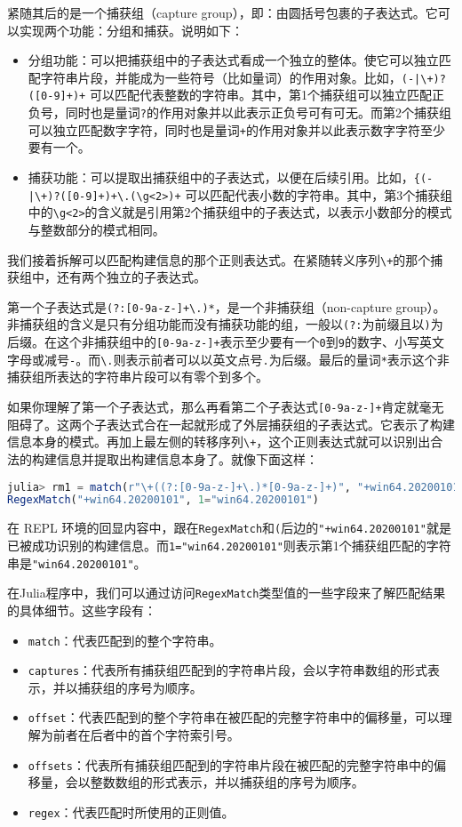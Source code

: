 紧随其后的是一个捕获组（capture group），即：由圆括号包裹的子表达式。它可以实现两个功能：分组和捕获。说明如下：

\begin{itemize}
\item 分组功能：可以把捕获组中的子表达式看成一个独立的整体。使它可以独立匹配字符串片段，并能成为一些符号（比如量词）的作用对象。比如，\verb`(-|\+)?([0-9]+)+` 可以匹配代表整数的字符串。其中，第1个捕获组可以独立匹配正负号，同时也是量词\verb`?`的作用对象并以此表示正负号可有可无。而第2个捕获组可以独立匹配数字字符，同时也是量词\verb`+`的作用对象并以此表示数字字符至少要有一个。
\item 捕获功能：可以提取出捕获组中的子表达式，以便在后续引用。比如，\verb`{(-|\+)?([0-9]+)+\.(\g<2>)+` 可以匹配代表小数的字符串。其中，第3个捕获组中的\verb`\g<2>`的含义就是引用第2个捕获组中的子表达式，以表示小数部分的模式与整数部分的模式相同。
\end{itemize}

我们接着拆解可以匹配构建信息的那个正则表达式。在紧随转义序列\verb`\+`的那个捕获组中，还有两个独立的子表达式。

第一个子表达式是\verb`(?:[0-9a-z-]+\.)*`，是一个非捕获组（non-capture group）。非捕获组的含义是只有分组功能而没有捕获功能的组，一般以\verb`(?:`为前缀且以\verb`)`为后缀。在这个非捕获组中的\verb`[0-9a-z-]+`表示至少要有一个\verb`0`到\verb`9`的数字、小写英文字母或减号\verb`-`。而\verb`\.`则表示前者可以以英文点号\verb`.`为后缀。最后的量词\verb`*`表示这个非捕获组所表达的字符串片段可以有零个到多个。

如果你理解了第一个子表达式，那么再看第二个子表达式\verb`[0-9a-z-]+`肯定就毫无阻碍了。这两个子表达式合在一起就形成了外层捕获组的子表达式。它表示了构建信息本身的模式。再加上最左侧的转移序列\verb`\+`，这个正则表达式就可以识别出合法的构建信息并提取出构建信息本身了。就像下面这样：
\begin{lstlisting}[language=julia]
julia> rm1 = match(r"\+((?:[0-9a-z-]+\.)*[0-9a-z-]+)", "+win64.20200101")
RegexMatch("+win64.20200101", 1="win64.20200101")
\end{lstlisting}

在 REPL 环境的回显内容中，跟在\verb`RegexMatch`和\verb`(`后边的\verb`"+win64.20200101"`就是已被成功识别的构建信息。而\verb`1="win64.20200101"`则表示第1个捕获组匹配的字符串是\verb`"win64.20200101"`。

在Julia程序中，我们可以通过访问\verb`RegexMatch`类型值的一些字段来了解匹配结果的具体细节。这些字段有：
\begin{itemize}
\item \verb`match`：代表匹配到的整个字符串。
\item \verb`captures`：代表所有捕获组匹配到的字符串片段，会以字符串数组的形式表示，并以捕获组的序号为顺序。
\item \verb`offset`：代表匹配到的整个字符串在被匹配的完整字符串中的偏移量，可以理解为前者在后者中的首个字符索引号。
\item \verb`offsets`：代表所有捕获组匹配到的字符串片段在被匹配的完整字符串中的偏移量，会以整数数组的形式表示，并以捕获组的序号为顺序。
\item \verb`regex`：代表匹配时所使用的正则值。
\end{itemize}


